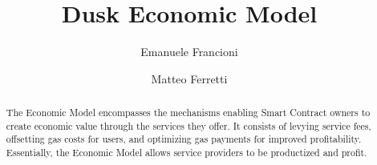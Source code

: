 \documentclass[twocolumn, nofootinbib]{revtex4-2}
\begin{document}
    \title{Dusk Economic Model}
    \author{Emanuele Francioni}
    \author{Matteo Ferretti}

    \begin{abstract}
        The Economic Model encompasses the mechanisms enabling Smart Contract
        owners to create economic value through the services they offer.
        It consists of levying service fees, offsetting gas costs for users,
        and optimizing gas payments for improved profitability.
        Essentially, the Economic Model allows service providers to be
        productized and profit.
    \end{abstract}

    \maketitle
\end{document}
